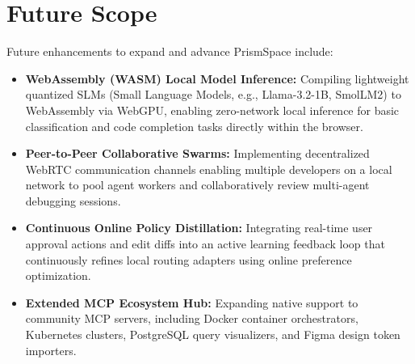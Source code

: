 \documentclass[12pt,a4paper]{report}
\begin{document}
\section{Future Scope}
Future enhancements to expand and advance PrismSpace include:
\begin{itemize}\setlength{\itemsep}{2pt}\setlength{\parskip}{0pt}\setlength{\parsep}{0pt}
    \item \textbf{WebAssembly (WASM) Local Model Inference:} Compiling lightweight quantized SLMs (Small Language Models, e.g., Llama-3.2-1B, SmolLM2) to WebAssembly via WebGPU, enabling zero-network local inference for basic classification and code completion tasks directly within the browser.
    \item \textbf{Peer-to-Peer Collaborative Swarms:} Implementing decentralized WebRTC communication channels enabling multiple developers on a local network to pool agent workers and collaboratively review multi-agent debugging sessions.
    \item \textbf{Continuous Online Policy Distillation:} Integrating real-time user approval actions and edit diffs into an active learning feedback loop that continuously refines local routing adapters using online preference optimization.
    \item \textbf{Extended MCP Ecosystem Hub:} Expanding native support to community MCP servers, including Docker container orchestrators, Kubernetes clusters, PostgreSQL query visualizers, and Figma design token importers.
\end{itemize}
\end{document}
